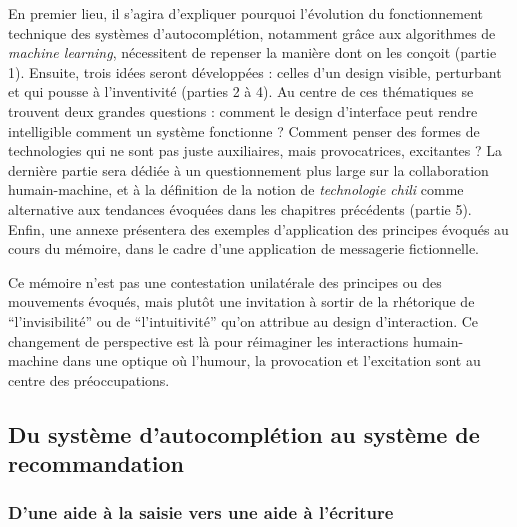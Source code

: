 \documentclass[]{article}
\begin{document}
En premier lieu, il s'agira d'expliquer pourquoi l'évolution du
fonctionnement technique des systèmes d'autocomplétion, notamment grâce
aux algorithmes de \emph{machine learning}, nécessitent de repenser la
manière dont on les conçoit (partie 1). Ensuite, trois idées seront
développées : celles d'un design visible, perturbant et qui pousse à
l'inventivité (parties 2 à 4). Au centre de ces thématiques se trouvent
deux grandes questions : comment le design d'interface peut rendre
intelligible comment un système fonctionne ? Comment penser des formes
de technologies qui ne sont pas juste auxiliaires, mais provocatrices,
excitantes ? La dernière partie sera dédiée à un questionnement plus
large sur la collaboration humain-machine, et à la définition de la
notion de \emph{technologie chili} comme alternative aux tendances
évoquées dans les chapitres précédents (partie 5). Enfin, une annexe
présentera des exemples d'application des principes évoqués au cours du
mémoire, dans le cadre d'une application de messagerie fictionnelle.

Ce mémoire n'est pas une contestation unilatérale des principes ou des
mouvements évoqués, mais plutôt une invitation à sortir de la rhétorique
de ``l'invisibilité'' ou de ``l'intuitivité'' qu'on attribue au design
d'interaction. Ce changement de perspective est là pour réimaginer les
interactions humain-machine dans une optique où l'humour, la provocation
et l'excitation sont au centre des préoccupations.

\newpage

\hypertarget{du-systuxe8me-dautocompluxe9tion-au-systuxe8me-de-recommandation}{%
\subsection{Du système d'autocomplétion au système de
recommandation}\label{du-systuxe8me-dautocompluxe9tion-au-systuxe8me-de-recommandation}}

\hypertarget{dune-aide-uxe0-la-saisie-vers-une-aide-uxe0-luxe9criture}{%
\subsubsection{D'une aide à la saisie vers une aide à
l'écriture}\label{dune-aide-uxe0-la-saisie-vers-une-aide-uxe0-luxe9criture}}
\end{document}
